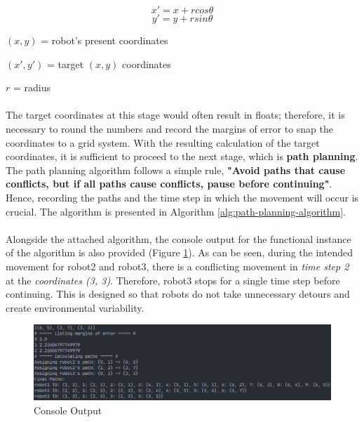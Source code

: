 \[x' = x + rcos\theta\]
\[y' = y + rsin\theta\]

\begin{description}
    \item 
    \item[where:]
    \item \((x, y)\) = robot's present coordinates
    \item \((x', y')\) = target \((x, y)\) coordinates
    \item \(r\) = radius
\end{description}

\paragraph*{}
The target coordinates at this stage would often result in floats; therefore, it is necessary to round the numbers and record the margins of error to snap the coordinates to a grid system. With the resulting calculation of the target coordinates, it is sufficient to proceed to the next stage, which is \textbf{path planning}. The path planning algorithm follows a simple rule, \textbf{"Avoid paths that cause conflicts, but if all paths cause conflicts, pause before continuing"}. Hence, recording the paths and the time step in which the movement will occur is crucial. The algorithm is presented in Algorithm \ref{alg:path-planning-algorithm}.

\paragraph*{}
Alongside the attached algorithm, the console output for the functional instance of the algorithm is also provided (Figure \ref{fig:formation_console_output}). As can be seen, during the intended movement for robot2 and robot3, there is a conflicting movement in \textit{time step 2} at the \textit{coordinates (3, 3)}. Therefore, robot3 stops for a single time step before continuing. This is designed so that robots do not take unnecessary detours and create environmental variability.

\begin{figure}[H]
    \centering
    \includegraphics[width=1\linewidth]{assets/images/formation/console_output.png}
    \caption{Console Output}
    \label{fig:formation_console_output}
\end{figure}

